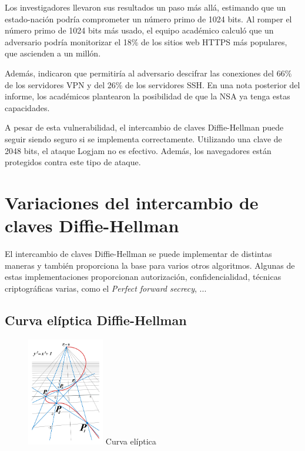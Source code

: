 \documentclass[11pt]{article}
\begin{document}
Los investigadores llevaron sus resultados un paso más allá, estimando que un estado-nación podría comprometer un número primo de 1024 bits. Al romper el número primo de 1024 bits más usado, el equipo académico calculó que un adversario podría monitorizar el 18$\%$ de los sitios web HTTPS más populares, que ascienden a un millón.

Además, indicaron que permitiría al adversario descifrar las conexiones del 66$\%$ de los servidores VPN y del 26$\%$ de los servidores SSH. En una nota posterior del informe, los académicos plantearon la posibilidad de que la NSA ya tenga estas capacidades.

A pesar de esta vulnerabilidad, el intercambio de claves Diffie-Hellman puede seguir siendo seguro si se implementa correctamente. Utilizando una clave de 2048 bits, el ataque Logjam no es efectivo. Además, los navegadores están protegidos contra este tipo de ataque.


\section{Variaciones del intercambio de claves Diffie-Hellman}

El intercambio de claves Diffie-Hellman se puede implementar de distintas maneras y también proporciona la base para varios otros algoritmos. Algunas de estas implementaciones proporcionan autorización, confidencialidad, técnicas criptográficas varias, como el \emph{Perfect forward secrecy}, ...

\newpage

\subsection{Curva elíptica Diffie-Hellman}

\begin{figure} %
    \centering
    \includegraphics[width=0.30\textwidth]{img/curva.jpg}
   	Curva elíptica
\end{figure}
\end{document}
